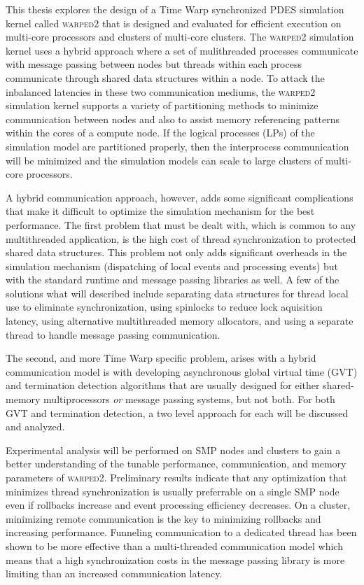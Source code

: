 \documentclass[11pt]{book}
\begin{document}
This thesis explores the design of a Time Warp synchronized PDES simulation kernel called
\textsc{warped2} that is designed and evaluated for efficient execution on multi-core processors and
clusters of multi-core clusters.  The \textsc{warped2} simulation kernel uses a hybrid approach
where a set of mulithreaded processes communicate with message passing between nodes but threads
within each process communicate through shared data structures within a node.  To attack the
inbalanced latencies in these two communication mediums, the \textsc{warped2} simulation kernel
supports a variety of partitioning methods to minimize communication between nodes and also to
assist memory referencing patterns within the cores of a compute node.  If the logical processes
(LPs) of the simulation model are partitioned properly, then the interprocess communication will be
minimized and the simulation models can scale to large clusters of multi-core processors.

A hybrid communication approach, however, adds some significant complications that make it difficult
to optimize the simulation mechanism for the best performance.  The first problem that must be dealt
with, which is common to any multithreaded application, is the high cost of thread synchronization
to protected shared data structures.  This problem not only adds significant overheads in the
simulation mechanism (dispatching of local events and processing events) but with the standard
runtime and message passing libraries as well.  A few of the solutions what will described include
separating data structures for thread local use to eliminate synchronization, using spinlocks to
reduce lock aquisition latency, using alternative multithreaded memory allocators, and using a
separate thread to handle message passing communication.

The second, and more Time Warp specific problem, arises with a hybrid communication model is with
developing asynchronous global virtual time (GVT) and termination detection algorithms that are
usually designed for either shared-memory multiprocessors \emph{or} message passing systems, but not
both.  For both GVT and termination detection, a two level approach for each will be discussed and
analyzed.

Experimental analysis will be performed on SMP nodes and clusters to gain a better understanding of
the tunable performance, communication, and memory parameters of \textsc{warped2}.  Preliminary
results indicate that any optimization that minimizes thread synchronization is usually preferrable
on a single SMP node even if rollbacks increase and event processing efficiency decreases.  On a
cluster, minimizing remote communication is the key to minimizing rollbacks and increasing
performance.  Funneling communication to a dedicated thread has been shown to be more effective than
a multi-threaded communication model which means that a high synchronization costs in the message
passing library is more limiting than an increased communication latency.
\end{document}
